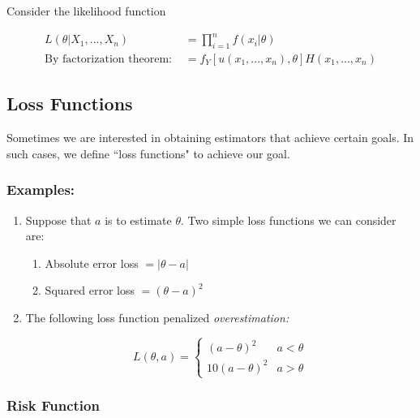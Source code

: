 \documentclass{article}
\begin{document}
Consider the likelihood function

\begin{equation*}
\begin{split}
    L(\theta|X_1,...,X_n) &= \prod_{i=1}^n f(x_i|\theta)\\
                \text{By factorization theorem: } &= f_Y[u(x_1,...,x_n),\theta] H(x_1,...,x_n)
\end{split}
\end{equation*}


\subsection{Loss Functions}

Sometimes we are interested in obtaining estimators that achieve certain goals. In such cases, we define ``loss functions" to achieve our goal.

\subsubsection*{Examples:}



\begin{enumerate}
\item Suppose that $a$ is to estimate $\theta$. Two simple loss functions we can consider are:
    \begin{enumerate}
        \item Absolute error loss $= |\theta-a|$
        \item Squared error loss $= (\theta-a)^2$
    \end{enumerate}

\item The following loss function penalized \textit{overestimation:}

\begin{equation*}
    L(\theta,a) = \begin{cases}
                (a-\theta)^2 & a < \theta \\
                10(a-\theta)^2 & a > \theta
                \end{cases}
\end{equation*}
\end{enumerate}

\subsubsection{Risk Function}
\end{document}
